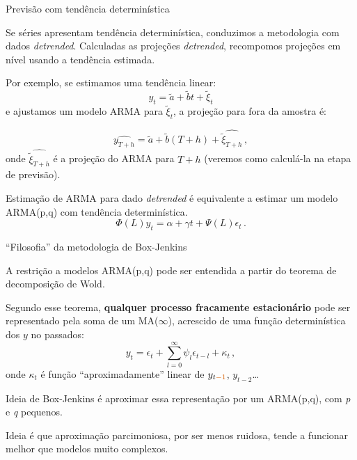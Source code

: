 \documentclass[11pt]{beamer}
\newenvironment{halfwideitemize}{\itemize\addtolength{\itemsep}{0.5em}}{\enditemize}
\begin{document}
\begin{frame}{Previsão com tendência determinística}
	\begin{halfwideitemize}
				\item Se séries apresentam tendência determinística, conduzimos a metodologia com dados \textit{detrended}. Calculadas as projeções \textit{detrended}, recompomos projeções em nível usando a tendência estimada.
				
				\item Por exemplo, se estimamos uma tendência linear:
				$$y_t = \tilde{a} + \tilde{b}t + \tilde{\xi}_t$$
				e ajustamos um modelo ARMA  para $\tilde{\xi}_t$, a projeção para fora da amostra é:
				
				$$\widehat{y_{T+h}} = \tilde{a} + \tilde{b}(T+h) + \widehat{\tilde{\xi}_{T+h}}\, ,$$
				onde $\widehat{\tilde{\xi}_{T+h}}$ é a projeção do ARMA para $T+h$ (veremos como calculá-la na etapa de previsão).
	\item Estimação de ARMA para dado \textit{detrended} é equivalente a estimar um modelo ARMA(p,q) com tendência determinística.
$$\Phi(L) y_t =  \alpha + \gamma t + \Psi(L)\epsilon_t \, .$$
	\end{halfwideitemize}
\end{frame}

\begin{frame}{``Filosofia'' da metodologia de Box-Jenkins}
	\begin{halfwideitemize}
		\item A restrição a modelos ARMA(p,q) pode ser entendida a partir do {\color{blue}teorema de decomposição de Wold.}
		\item Segundo esse teorema, \textbf{qualquer processo fracamente estacionário} pode ser representado pela soma de um MA($\infty$), acrescido de uma função determinística dos $y$ no passados:
		$$y_t = \epsilon_t  +\sum_{l=0}^\infty \psi_l \epsilon_{t-l} + \kappa_t \, ,$$
		onde $\kappa_t$ é função ``aproximadamente'' linear de $y_{t{\color{red}-1}}$, $y_{t-2}$\ldots 
			\item Ideia de Box-Jenkins é aproximar essa representação por um ARMA(p,q), com \textit{p} e \textit{q} {\color{blue}pequenos}.
		\begin{halfwideitemize}
			\item Ideia é que aproximação {\color{blue}parcimoniosa}, por ser menos ruidosa, tende a funcionar melhor que modelos muito complexos.
		\end{halfwideitemize}	
	\end{halfwideitemize}
\end{frame}
\end{document}
